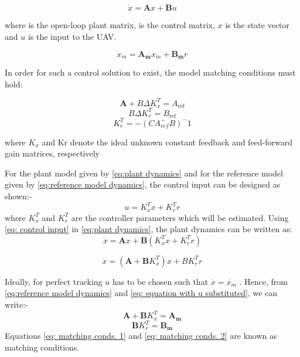 \documentclass[12pt]{article}
\begin{document}
\begin{equation}
    \dot{x} = \boldsymbol{A}x +\boldsymbol{B}u
        \label{eq:plant dynamics}
\end{equation}

where  is the open-loop plant matrix,  is the control matrix, $x$ is the state vector and $u$ is the input to the UAV. 

\begin{equation}
    \dot{x}_m = \boldsymbol{A_m} x_m + \boldsymbol{B_m} r
        \label{eq:reference model dynamics}
\end{equation}

In order for such a control solution to exist, the model matching conditions must
hold:

\begin{equation}
    \boldsymbol{A} + B \Delta K_x^T = A_\text{ref}
\end{equation}
\begin{equation}
    B \Delta K_r^T = B_\text{ref}
       
\end{equation}
\begin{equation}
    K_r^T = -(CA_{ref}^-B)^-1
\end{equation}

where $K_{x}$ and Kr denote the ideal unknown constant feedback and feed-forward gain
matrices, respectively

For the plant model given by \ref{eq:plant dynamics} and for the reference model
given by \ref{eq:reference model dynamics}, the control input can be designed as shown:-
\begin{equation}
    u =  K_x^T x +  K_r^T r
    \label{eq: control input}
\end{equation}
where $K_x^T$ and $K_r^T$ are the controller parameters which will be
estimated. Using \ref{eq: control input} in \ref{eq:plant dynamics}, the plant dynamics can be written
as:
\begin{equation}
    \dot{x} = \boldsymbol{A}x +\boldsymbol{B}( K_x^T x +  K_r^T r)
\end{equation}

\begin{equation}
    \dot{x} = (\boldsymbol{A} +\boldsymbol{B}K_x^T)x +  BK_r^T r
    \label{eq: equation with u substituted}
\end{equation}

Ideally, for perfect tracking $u$ has to be chosen such that $\dot{x} = \dot{x_m}$ . Hence, from \ref{eq:reference model dynamics} and \ref{eq: equation with u substituted}, we can write:-
\begin{equation}
    \boldsymbol{A}  + \boldsymbol{B}K_x^T = \boldsymbol{A_m}
    \label{eq: matching conds. 1}
\end{equation}
\begin{equation}
    \boldsymbol{B}K_r^T = \boldsymbol{B_m}
    \label{eq: matching conds. 2}
\end{equation}
Equations \ref{eq: matching conds. 1} and \ref{eq: matching conds. 2} are known as matching conditions.
\end{document}
